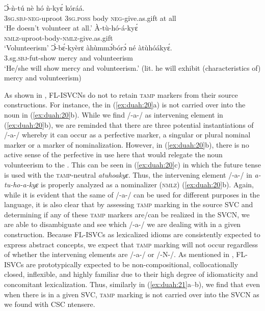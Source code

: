 \documentclass[output=paper,modfonts,nonflat,
colorlinks, citecolor=brown,
]{langsci/langscibook}
\begin{document}
\ea\label{ex:duah:20}
\ea\label{ex:duah:20a}
\gll Ɔ̀-ǹ-tú nè hó ǹ-kyɛ́ kóráá.\\
3\textsc{sg}.\textsc{sbj}-\textsc{neg}-uproot 3\textsc{sg}.\textsc{poss} body \textsc{neg}-give.as.gift {at all}\\
\glt `He doesn’t volunteer at all.'
\ex\label{ex:duah:20b}
\gll À-tù-hó-á-kyɛ́\\
\textsc{nmlz}-uproot-body-\textsc{nmlz}-give.as.gift\\
\glt `Volunteerism'
\ex\label{ex:duah:20c}
\gll Ɔ̀-bɛ́-kyèrɛ àhùmmɔ́bórɔ́ né àtùhóákyɛ́.\\
3.sg.\textsc{sbj}-fut-show mercy and 	volunteerism\\
\glt `He/she will show mercy and volunteerism.' (lit. he will exhibit (characteristics of) mercy and volunteerism)
\z
\z

As shown in , FL-ISVCNs do not to retain \textsc{tamp} markers from their source constructions. For instance, the  in (\ref{ex:duah:20}a) is not carried over into the noun in (\ref{ex:duah:20}b). While we find /-a-/ as intervening element in (\ref{ex:duah:20}b), we are reminded that there are three potential instantiations of /-a-/ whereby it can occur as a perfective marker, a singular or plural nominal marker or a marker of nominalization. However, in (\ref{ex:duah:20}b), there is no active sense of the perfective in use here that would relegate the noun volunteerism to the . This can be seen in (\ref{ex:duah:20}c) in which the future tense is used with the \textsc{tamp}-neutral \textit{atuhoakyɛ}. Thus, the intervening element /-a-/ in \textit{a-tu-ho-a-kyɛ} is properly analyzed as a nominalizer (\textsc{nmlz}) (\ref{ex:duah:20}b). Again, while it is evident that the same  of /-a-/ can be used for different purposes in the language, it is also clear that by assessing \textsc{tamp} marking in the source SVC and determining if any of these \textsc{tamp} markers are/can be realized in the SVCN, we are able to disambiguate and see which /-a-/ we are dealing with in a given construction. Because FL-ISVCs as lexicalized idioms are consistently expected to express abstract concepts, we expect that \textsc{tamp} marking will not occur regardless of whether the intervening elements are /-a-/ or /-N-/. As mentioned in , FL-ISVCs are prototypically expected to be non-compositional, collocationally closed, inflexible, and highly familiar due to their high degree of idiomaticity and concomitant lexicalization. Thus, similarly in (\ref{ex:duah:21}a--b), we find that even when there is  in a given SVC, \textsc{tamp} marking is not carried over into the SVCN as we found with CSC ntensere.
\end{document}
